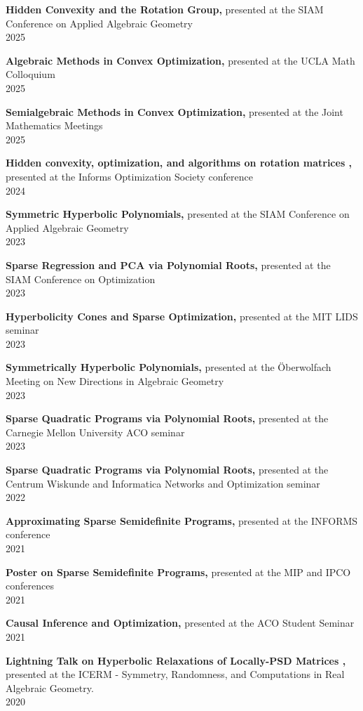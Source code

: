 \documentclass[margin]{res}
\begin{document}
\begin{resume}
{\bf  Hidden Convexity and the Rotation Group,} presented at the SIAM Conference on Applied Algebraic Geometry \\ 2025

{\bf  Algebraic Methods in Convex Optimization,} presented at the UCLA Math Colloquium \\ 2025

{\bf  Semialgebraic Methods in Convex Optimization,} presented at the Joint Mathematics Meetings \\ 2025 

{\bf  Hidden convexity, optimization, and algorithms on rotation matrices  ,} presented at the Informs Optimization Society conference \\ 2024 

{\bf  Symmetric Hyperbolic Polynomials,} presented at the SIAM Conference on Applied Algebraic Geometry \\ 2023 

{\bf  Sparse Regression and PCA via Polynomial Roots,} presented at the SIAM Conference on Optimization \\ 2023 

{\bf  Hyperbolicity Cones and Sparse Optimization,} presented at the MIT LIDS seminar \\ 2023 

{\bf  Symmetrically Hyperbolic Polynomials,} presented at the \"Oberwolfach Meeting on New Directions in Algebraic Geometry \\ 2023 

{\bf  Sparse Quadratic Programs via Polynomial Roots,} presented at the Carnegie Mellon University ACO seminar \\ 2023 

{\bf  Sparse Quadratic Programs via Polynomial Roots,} presented at the Centrum Wiskunde and Informatica Networks and Optimization seminar \\ 2022 

{\bf  Approximating Sparse Semidefinite Programs,} presented at the INFORMS conference \\ 2021 

{\bf  Poster on Sparse Semidefinite Programs,} presented at the MIP and IPCO conferences \\ 2021 

{\bf  Causal Inference and Optimization,} presented at the ACO Student Seminar \\ 2021

{\bf  Lightning Talk on Hyperbolic Relaxations of Locally-PSD Matrices ,} presented at the ICERM - Symmetry, Randomness, and Computations in Real Algebraic Geometry.
 \\ 2020




\end{resume}
\end{document}
